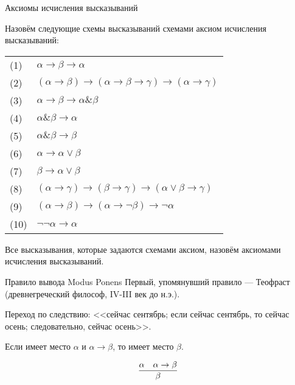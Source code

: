 \documentclass[handout]{beamer}
\begin{document}
\begin{frame}{Аксиомы исчисления высказываний}

\begin{defrus}Назовём следующие схемы высказываний схемами аксиом исчисления высказываний:

\begin{tabular}{ll}
(1) & $\alpha \rightarrow \beta \rightarrow \alpha$ \\
(2) & $(\alpha \rightarrow \beta) \rightarrow (\alpha \rightarrow \beta \rightarrow \gamma) \rightarrow (\alpha \rightarrow \gamma)$ \\
(3) & $\alpha \rightarrow \beta \rightarrow \alpha \& \beta$\\
(4) & $\alpha \& \beta \rightarrow \alpha$\\
(5) & $\alpha \& \beta \rightarrow \beta$\\
(6) & $\alpha \rightarrow \alpha \vee \beta$\\
(7) & $\beta \rightarrow \alpha \vee \beta$\\
(8) & $(\alpha \rightarrow \gamma) \rightarrow (\beta \rightarrow \gamma) \rightarrow (\alpha \vee \beta \rightarrow \gamma)$\\
(9) & $(\alpha \rightarrow \beta) \rightarrow (\alpha \rightarrow \neg \beta) \rightarrow \neg \alpha$\\
(10) & $\neg \neg \alpha \rightarrow \alpha$
\end{tabular}

Все высказывания, которые задаются схемами аксиом, назовём аксиомами исчисления высказываний.
\end{defrus}
\end{frame}

\begin{frame}{Правило вывода Modus Ponens}
Первый, упомянувший правило --- Теофраст (древнегреческий философ, IV-III век до н.э.).\pause

\vspace{1cm}

Переход по следствию: <<сейчас сентябрь; если сейчас сентябрь, то сейчас осень; следовательно, сейчас осень>>.\pause

\vspace{1cm}

Если имеет место $\alpha$ и $\alpha\rightarrow\beta$, то имеет место $\beta$.

$$\infer{\beta}{\alpha & \alpha\rightarrow\beta}$$
\end{frame}
\end{document}
